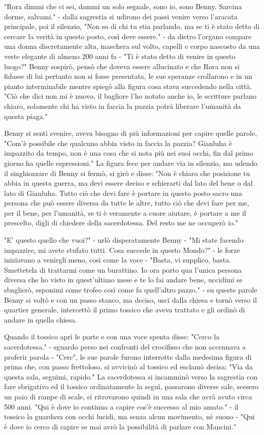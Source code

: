 "Rora dimmi che ci sei, dammi un solo segnale, sono io, sono Benny. Sarcina dorme, salvami." - dalla sagrestia si udirono dei passi venire verso l'aracata principale, poi il silenzio, "Non so di chi tu stia parlando, ma se ti è stato detto di cercare la verità in questo posto, così deve essere." - da dietro l'organo compare una donna discretamente alta, maschera sul volto, capelli e corpo nascosto da una veste elegante di almeno 200 anni fa - "Ti è stato detto di venire in questo luogo?" 
Benny sospirò, pensò che doveva essere allucinato e che Rora non si fidasse di lui pertanto non si fosse presentata, le sue speranze crollarono e in un pianto interminabile mentre spiegò alla figura cosa stava succedendo nella città.
"Ciò che dici non mi è nuovo, il bagliore l'ho notato anche io, le scritture parlano chiaro, solamente chi ha visto in faccia la pazzia potrà liberare l'umanità da questa piaga."

Benny si sentì svenire, aveva bisogno di più informazioni per capire quelle parole, "Com'è possibile che qualcuno abbia visto in faccia la pazzia? Gianluha è impazzito da tempo, non è una cosa che si nota più nei suoi occhi, fin dal primo giorno ha quelle espressioni."
La figura fece per andare via in silenzio, ma udendo il singhiozzare di Benny si fermò, si girò e disse: "Non è chiaro che posizione tu abbia in questa guerra, ma devi essere deciso e schierarti dal lato del bene o dal lato di Gianluha. Tutto ciò che devi fare è portare in questo posto sacro una persona che può essere diversa da tutte le altre, tutto ciò che devi fare per me, per il bene, per l'umanità, se ti è veramente a cuore aiutare, è portare a me il prescelto, digli di chiedere della sacerdotessa. Del resto me ne occuperò io."

"E' questo quello che vuoi?" - urlò disperatamente Benny - "Mi state facendo impazzire, mi avete stufato tutti. Cosa succede in questo Mondo?" - le forze iniziavano a venirgli meno, così come la voce - "Basta, vi supplico, basta. Smettetela di trattarmi come un burattino. Io ora porto qua l'unica persona diversa che ho visto in quest'ultimo mese e te lo fai andare bene, uccidimi se sbaglierò, esponimi come trofeo così come fa quell'altro pazzo." - su queste parole Benny si voltò e con un passo stanco, ma deciso, uscì dalla chiesa e tornò verso il quartier generale, intercettò il primo tossico che aveva trattato e gli ordinò di andare in quella chiesa.

Quando il tossico aprì le porte e con una voce spenta disse: "Cerco la sacerdotessa." - sguardo perso nei confronti del crocifisso che non accennava a proferir parola - "Cerc", le sue parole furono interrotte dalla medesima figura di prima che, con passo frettoloso, si avvicinò al tossico ed esclamò decisa: "Via da questa sala, seguimi, rapido."
La sacerdotessa si incamminò verso la sagrestia con fare sbrigativo ed il tossico ordinatamente la seguì, passarono diverse sale, scesero un paio di rampe di scale, si ritrovarono quindi in una sala che avrà avuto circa 500 anni. "Qui è dove io continuo a capire cos'è successo al mio amato." - il tossico la guardava con occhi lucidi, ma senza alcun movimento, nè suono - "Qui è dove io cerco di capire se mai avrò la possibilità di parlare con Mancini." 

